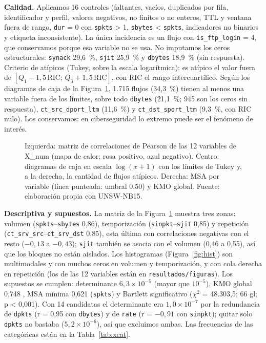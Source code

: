 \textbf{Calidad.} Aplicamos 16 controles (faltantes, vacíos, duplicados por fila, identificador y perfil, valores negativos, no finitos o no enteros, TTL y ventana fuera de rango, \texttt{dur} = 0 con \texttt{spkts} > 1, \texttt{sbytes} < \texttt{spkts}, indicadores no binarios y etiqueta inconsistente). La única incidencia es un flujo con \texttt{is\_ftp\_login} = 4, que conservamos porque esa variable no se usa. No imputamos los ceros estructurales: \texttt{synack} 29,6~\%, \texttt{sjit} 25,9~\% y \texttt{dbytes} 18,9~\% (sin respuesta). Criterio de atípicos (Tukey, sobre la escala logarítmica): es atípico el valor fuera de $[Q_1-1{,}5\,\mathrm{RIC};\,Q_3+1{,}5\,\mathrm{RIC}]$, con RIC el rango intercuartílico. Según los diagramas de caja de la Figura~\ref{fig:datos}, 1.715 flujos (34,3~\%) tienen al menos una variable fuera de los límites, sobre todo \texttt{dbytes} (21,1~\%; 945 son los ceros sin respuesta), \texttt{ct\_src\_dport\_ltm} (11,6~\%) y \texttt{ct\_dst\_sport\_ltm} (9,3~\%, con RIC nulo). Los conservamos: en ciberseguridad lo extremo puede ser el fenómeno de interés.

\begin{figure}[htbp]
  \centering
  \caption[Correlaciones, diagramas de caja y MSA de X\_num]{Izquierda: matriz de correlaciones de Pearson de las 12 variables de X\_num (mapa de calor; rosa positivo, azul negativo). Centro: diagramas de caja en escala $\log(x+1)$ con los límites de Tukey y, a la derecha, la cantidad de flujos atípicos. Derecha: MSA por variable (línea punteada: umbral 0,50) y KMO global. Fuente: elaboración propia con UNSW-NB15.}
  \label{fig:datos}
\end{figure}

\textbf{Descriptiva y supuestos.} La matriz de la Figura~\ref{fig:datos} muestra tres zonas: volumen (\texttt{spkts}--\texttt{sbytes} 0,86), temporización (\texttt{sinpkt}--\texttt{sjit} 0,85) y repetición (\texttt{ct\_srv\_src}--\texttt{ct\_srv\_dst} 0,85), esta última con correlaciones negativas con el resto ($-0{,}13$ a $-0{,}43$); \texttt{sjit} también se asocia con el volumen (0,46 a 0,55), así que los bloques no están aislados. Los histogramas (Figura~\ref{fig:hist}) son multimodales y con muchos ceros en volumen y temporización, y con cola derecha en repetición (los de las 12 variables están en \texttt{resultados/figuras}). Los supuestos se cumplen: determinante $6{,}3\times10^{-5}$ (mayor que $10^{-5}$), KMO global 0,748 \citep{kaiser1974}, MSA mínima 0,621 (\texttt{spkts}) y Bartlett significativo ($\chi^2$ = 48.303,5; 66 gl; p < 0,001). Con 14 candidatas el determinante era $1{,}0\times10^{-7}$ por la redundancia de \texttt{dpkts} (r = 0,95 con \texttt{dbytes}) y de \texttt{rate} (r = $-0,91$ con \texttt{sinpkt}); quitar solo \texttt{dpkts} no bastaba ($5{,}2\times10^{-6}$), así que excluimos ambas. Las frecuencias de las categóricas están en la Tabla~\ref{tab:xcat}.

